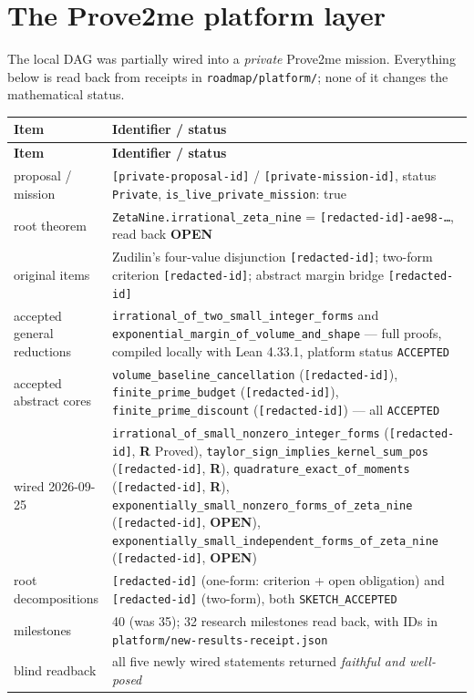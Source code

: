 \documentclass[11pt]{article}
\newcommand{\stR}{\textcolor{okgreen}{\textbf{R}}}
\newcommand{\stO}{\textcolor{gapred}{\textbf{OPEN}}}
\begin{document}
\section{The Prove2me platform layer}
\label{sec:platform}

The local DAG was partially wired into a \emph{private} Prove2me mission. Everything below is
read back from receipts in \texttt{roadmap/platform/}; none of it changes the mathematical status.

\begin{longtable}{@{}p{}p{}@{}}
\toprule \textbf{Item} & \textbf{Identifier / status} \\ \midrule
\endfirsthead
\toprule \textbf{Item} & \textbf{Identifier / status} \\ \midrule
\endhead
proposal / mission & \texttt{[private-proposal-id]} /
    \texttt{[private-mission-id]}, status \texttt{Private},
    \texttt{is\_live\_private\_mission}: true \\
root theorem & \texttt{ZetaNine.irrational\_zeta\_nine} = \texttt{[redacted-id]-ae98-\dots}, read back
    \stO \\
original items & Zudilin's four-value disjunction \texttt{[redacted-id]}; two-form criterion
    \texttt{[redacted-id]}; abstract margin bridge \texttt{[redacted-id]} \\
accepted general reductions & \texttt{irrational\_of\_two\_small\_integer\_forms} and
    \texttt{exponential\_margin\_of\_volume\_and\_shape} --- full proofs, compiled locally with Lean
    4.33.1, platform status \texttt{ACCEPTED} \\
accepted abstract cores & \texttt{volume\_baseline\_cancellation} (\texttt{[redacted-id]}),
    \texttt{finite\_prime\_budget} (\texttt{[redacted-id]}),
    \texttt{finite\_prime\_discount} (\texttt{[redacted-id]}) --- all \texttt{ACCEPTED} \\
wired 2026-09-25 & \texttt{irrational\_of\_small\_nonzero\_integer\_forms} (\texttt{[redacted-id]},
    \stR{} Proved), \texttt{taylor\_sign\_implies\_kernel\_sum\_pos} (\texttt{[redacted-id]}, \stR{}),
    \texttt{quadrature\_exact\_of\_moments} (\texttt{[redacted-id]}, \stR{}),
    \texttt{exponentially\_small\_nonzero\_forms\_of\_zeta\_nine} (\texttt{[redacted-id]}, \stO{}),
    \texttt{exponentially\_small\_independent\_forms\_of\_zeta\_nine} (\texttt{[redacted-id]}, \stO{}) \\
root decompositions & \texttt{[redacted-id]} (one-form: criterion + open obligation) and \texttt{[redacted-id]}
    (two-form), both \texttt{SKETCH\_ACCEPTED} \\
milestones & 40 (was 35); 32 research milestones read back, with IDs in
    \texttt{platform/new-results-receipt.json} \\
blind readback & all five newly wired statements returned \emph{faithful and well-posed} \\
\bottomrule
\end{longtable}
\end{document}
